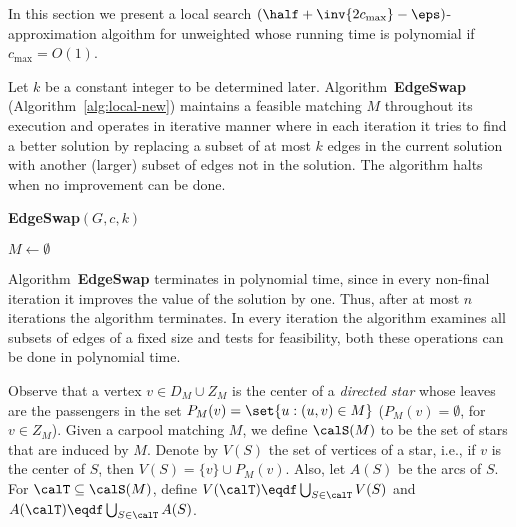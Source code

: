 
In this section we present a local search $(\half + \inv{2c_{\max}}
- \eps)$-approximation algoithm for unweighted \carpool whose running
time is polynomial if $c_{\max} = O(1)$.

Let $k$ be a constant integer to be determined later.
Algorithm~\textbf{EdgeSwap} (Algorithm~\ref{alg:local-new}) maintains a
feasible matching $M$ throughout its execution and operates in
iterative manner where in each iteration it tries to find a better
solution by replacing a subset of at most $k$ edges in the current
solution with another (larger) subset of edges not in the solution.
The algorithm halts when no improvement can be done. 

\begin{algorithm}
\caption[]{\textbf{EdgeSwap}$(G,c,k)$}
\label{alg:local-new}
\begin{small}
$M \leftarrow \emptyset$								\\
\end{small}
\end{algorithm}

Algorithm~\textbf{EdgeSwap} terminates in polynomial time, since in
every non-final iteration it improves the value of the solution by
one.  Thus, after at most $n$ iterations the algorithm terminates.  In
every iteration the algorithm examines all subsets of edges of a fixed
size and tests for feasibility, both these operations can be done in
polynomial time.

Observe that a vertex $v \in D_M \cup Z_M$ is the center of
a \emph{directed star} whose leaves are the passengers in the set
$P_M(v) = \set{u : (u,v) \in M}$
($P_M(v) = \emptyset$, for $v \in Z_M$).
%
Given a carpool matching $M$, we define $\calS(M)$ to be the set of
stars that are induced by $M$.  Denote by $V(S)$ the set of vertices
of a star, i.e., if $v$ is the center of $S$, then $V(S) = \{v\} \cup
P_M(v)$.  Also, let $A(S)$ be the arcs of $S$.  For
$\calT \subseteq \calS(M)$, define
$V(\calT) \eqdf \bigcup_{S \in \calT} V(S)$ and
$A(\calT) \eqdf \bigcup_{S \in \calT} A(S)$.

